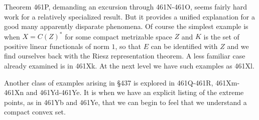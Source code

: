 {Theorem 461P, demanding an excursion through 461N-461O, seems fairly hard
work for a relatively specialized result.   But it provides a unified
explanation for a good many apparently disparate phenomena.   Of course the
simplest example is when $X=C(Z)^*$ for some compact metrizable space $Z$
and $K$ is the set of positive linear functionals of norm $1$, so that $E$
can be identified with $Z$ and we find ourselves back with the Riesz
representation theorem.   A less familiar case already examined is in
461Xk.   At the next level we have such examples as 461Xl.

Another class of examples arising in \S437
is explored in 461Q-461R, 461Xm-461Xn and 461Yd-461Ye.
It is when we have an explicit listing of the extreme points,
as in 461Yb and 461Ye,
that we can begin to feel that we understand a compact convex set.
}%


\discrpage

